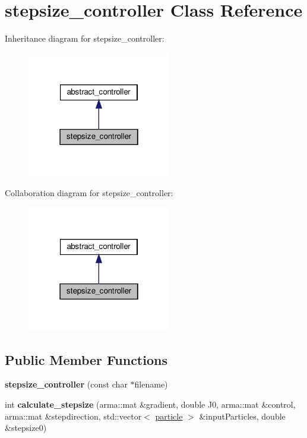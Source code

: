 \hypertarget{classstepsize__controller}{}\section{stepsize\+\_\+controller Class Reference}
\label{classstepsize__controller}


Inheritance diagram for stepsize\+\_\+controller\+:\nopagebreak
\begin{figure}[H]
\begin{center}
\leavevmode
\includegraphics[width=178pt]{classstepsize__controller__inherit__graph}
\end{center}
\end{figure}


Collaboration diagram for stepsize\+\_\+controller\+:\nopagebreak
\begin{figure}[H]
\begin{center}
\leavevmode
\includegraphics[width=178pt]{classstepsize__controller__coll__graph}
\end{center}
\end{figure}
\subsection*{Public Member Functions}
\begin{DoxyCompactItemize}
\item 
\mbox{\label{classstepsize__controller_a40fdd3ec7f99b19f0e7c365dcc839171}} 
{\bfseries stepsize\+\_\+controller} (const char $\ast$filename)
\item 
\mbox{\label{classstepsize__controller_adcdbd7a6b4c5bc02e7d0a9841c5f44c7}} 
int {\bfseries calculate\+\_\+stepsize} (arma\+::mat \&gradient, double J0, arma\+::mat \&control, arma\+::mat \&stepdirection, std\+::vector$<$ \hyperlink{classparticle}{particle} $>$ \&input\+Particles, double \&stepsize0)
\end{DoxyCompactItemize}


